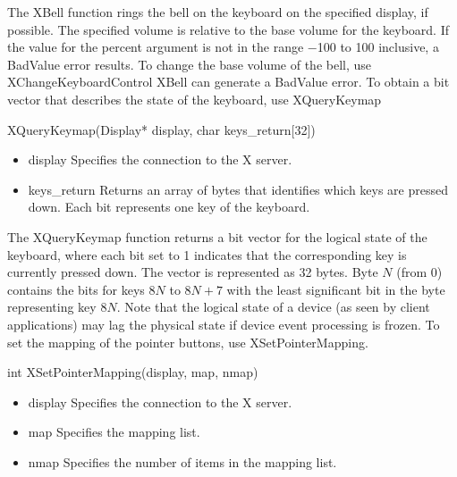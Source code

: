 \documentclass{report}
\begin{document}
\begin{itemize}
\begin{itemize}
\begin{itemize}
            \end{itemize}
            The XBell function rings the bell on the keyboard on the specified display, if possible. The specified volume is relative to the base volume for the keyboard. If the value for the percent argument is not in the range −100 to 100 inclusive, a BadValue error results.
            \bigbreak \noindent 
            To change the base volume of the bell, use XChangeKeyboardControl
            \bigbreak \noindent 
            XBell can generate a BadValue error.
            \bigbreak \noindent 
            To obtain a bit vector that describes the state of the keyboard, use XQueryKeymap
            \bigbreak \noindent 
            \begin{cppcode}
                XQueryKeymap(Display* display, char keys_return[32])
            \end{cppcode}
            \begin{itemize}
                \item display Specifies the connection to the X server.
                \item keys\_return Returns an array of bytes that identifies which keys are pressed down. Each bit represents one key of the keyboard.
            \end{itemize}
            The XQueryKeymap function returns a bit vector for the logical state of the keyboard, where each bit set to 1 indicates that the corresponding key is currently pressed down. The vector is represented as 32 bytes. Byte $N$ (from 0) contains the bits for keys $8N$ to $8N + 7$ with the least significant bit in the byte representing key $8N$.
            \bigbreak \noindent 
            Note that the logical state of a device (as seen by client applications) may lag the physical state if device event processing is frozen.
            \bigbreak \noindent 
            To set the mapping of the pointer buttons, use XSetPointerMapping.
            \bigbreak \noindent 
            \begin{cppcode}
            int XSetPointerMapping(display, map, nmap)
            \end{cppcode}
            \begin{itemize}
                \item display Specifies the connection to the X server.
                \item map Specifies the mapping list.
                \item nmap Specifies the number of items in the mapping list.
            \end{itemize}

\end{itemize}
\end{itemize}
\end{document}

